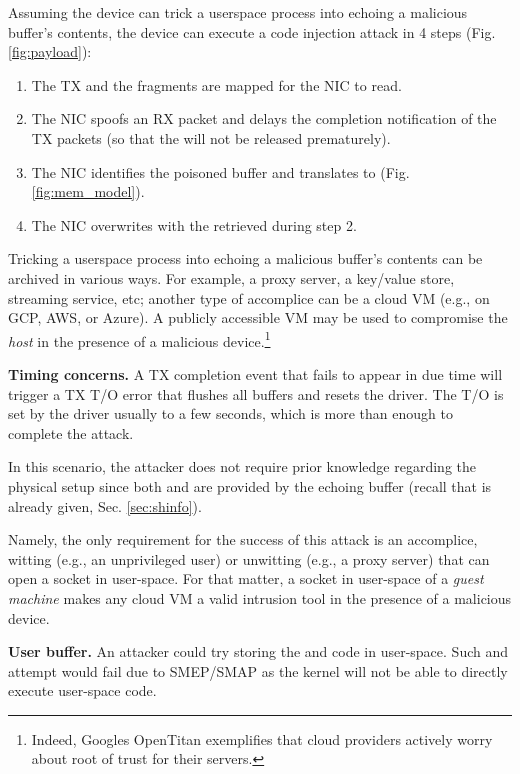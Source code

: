 
Assuming the device can trick a userspace process into echoing a malicious buffer's contents, the device can execute a code injection attack in 4 steps (Fig. \ref{fig:payload}):

\begin{enumerate}
    \item The TX \data{} and the fragments are mapped for the NIC to read.
    \item The NIC spoofs an RX packet and delays the completion notification of the TX packets (so that the \mabaf{} will not be released prematurely).
    \item The NIC identifies the poisoned buffer and translates \page{} to \kva{} (Fig. \ref{fig:mem_model}).
    \item The NIC overwrites \shinfo{} with the \kva{} retrieved during step 2. 
\end{enumerate}

Tricking a userspace process into echoing a malicious buffer's contents can be archived in various ways. For example, a proxy server, a key/value store, streaming service, etc; another type of accomplice can be a cloud VM (e.g., on GCP, AWS, or Azure). A publicly accessible VM may be used to compromise the \emph{host} in the presence of a malicious device.\footnote{Indeed, Googles OpenTitan \cite{opentitan} exemplifies that cloud providers actively worry about root of trust for their servers.}

\textbf{Timing concerns.} A TX completion event that fails to appear in due time will trigger a TX T/O error that flushes all buffers and resets the driver. The T/O is set by the driver usually to a few seconds, which is more than enough to complete the attack.
 
In this scenario, the attacker does not require prior knowledge regarding the physical setup since both \means{} and \motivation{} are provided by the echoing buffer (recall that \oportunity{} is already given, Sec. \ref{sec:shinfo}).  

Namely, the only requirement for the success of this attack is an accomplice, witting (e.g., an unprivileged user) or unwitting (e.g., a proxy server) that can open a socket in user-space. For that matter, a socket in user-space of a \emph{guest machine} makes any cloud VM a valid intrusion tool in the presence of a malicious device.

\smallskip
\noindent\textbf{User buffer.} An attacker could try storing the \mabaf{} and code in user-space. Such and attempt would fail due to SMEP/SMAP \cite{smep} as the kernel will not be able to directly execute user-space code.





